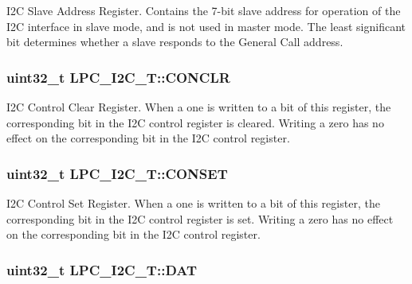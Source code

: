 I2\-C Slave Address Register. Contains the 7-\/bit slave address for operation of the I2\-C interface in slave mode, and is not used in master mode. The least significant bit determines whether a slave responds to the General Call address. \hypertarget{structLPC__I2C__T_a091c12dd25fb7db692339da933c8b523}{
\subsubsection[{C\-O\-N\-C\-L\-R}]{ uint32\-\_\-t L\-P\-C\-\_\-\-I2\-C\-\_\-\-T\-::\-C\-O\-N\-C\-L\-R}}\label{structLPC__I2C__T_a091c12dd25fb7db692339da933c8b523}
I2\-C Control Clear Register. When a one is written to a bit of this register, the corresponding bit in the I2\-C control register is cleared. Writing a zero has no effect on the corresponding bit in the I2\-C control register. \hypertarget{structLPC__I2C__T_a98ed6d816b3c7e00a29b32956fe5fa2d}{
\subsubsection[{C\-O\-N\-S\-E\-T}]{ uint32\-\_\-t L\-P\-C\-\_\-\-I2\-C\-\_\-\-T\-::\-C\-O\-N\-S\-E\-T}}\label{structLPC__I2C__T_a98ed6d816b3c7e00a29b32956fe5fa2d}
I2\-C Control Set Register. When a one is written to a bit of this register, the corresponding bit in the I2\-C control register is set. Writing a zero has no effect on the corresponding bit in the I2\-C control register. \hypertarget{structLPC__I2C__T_ab3babd27c9d202c1fefce13d5498d473}{
\subsubsection[{D\-A\-T}]{ uint32\-\_\-t L\-P\-C\-\_\-\-I2\-C\-\_\-\-T\-::\-D\-A\-T}}\label{structLPC__I2C__T_ab3babd27c9d202c1fefce13d5498d473}
